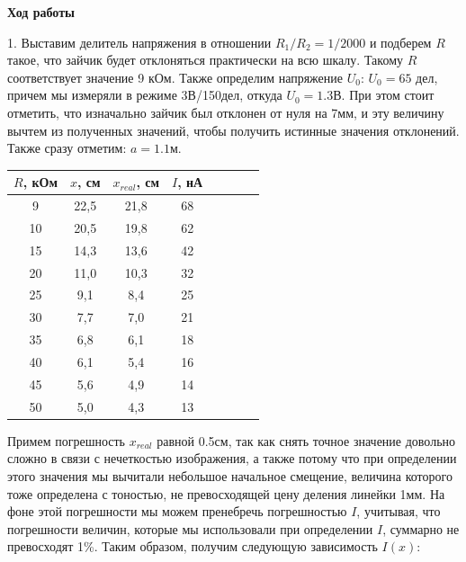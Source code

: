 \documentclass[14pt]{article}
\begin{document}
\newpage
\textbf{Ход работы}

1. Выставим делитель напряжения в отношении $R_1/R_2 = 1/2000$ и подберем $R$ такое, что зайчик будет отклоняться практически на всю шкалу. Такому $R$ соответствует значение 9 кОм. Также определим напряжение $U_0$: $U_0 = 65$ дел, причем мы измеряли в режиме 3В/150дел, откуда $U_0 = 1.3$В. При этом стоит отметить, что изначально зайчик был отклонен от нуля на 7мм, и эту величину вычтем из полученных значений, чтобы получить истинные значения отклонений. Также сразу отметим: $a = 1.1$м.

\begin{center}
\begin{tabular}{|c|c|c|c|c|c|c|c|}
\hline
$R$, кОм&$x$, см&$x_{real}$, см&$I$, нА\\
\hline
9&22,5&21,8&68\\
\hline
10&20,5&19,8&62\\
\hline
15&14,3&13,6&42\\
\hline
20&11,0&10,3&32\\
\hline
25&9,1&8,4&25\\
\hline
30&7,7&7,0&21\\
\hline
35&6,8&6,1&18\\
\hline
40&6,1&5,4&16\\
\hline
45&5,6&4,9&14\\
\hline
50&5,0&4,3&13\\
\hline
\end{tabular}
\end{center}

Примем погрешность $x_{real}$ равной 0.5см, так как снять точное значение довольно сложно в связи с нечеткостью изображения, а также потому что при определении этого значения мы вычитали небольшое начальное смещение, величина которого тоже определена с тоностью, не превосходящей цену деления линейки 1мм. На фоне этой погрешности мы можем пренебречь погрешностью $I$, учитывая, что погрешности величин, которые мы использовали при определении $I$, суммарно не превосходят 1\%. Таким образом, получим следующую зависимость $I(x)$:

\vspace{0.5cm}
\end{document}
